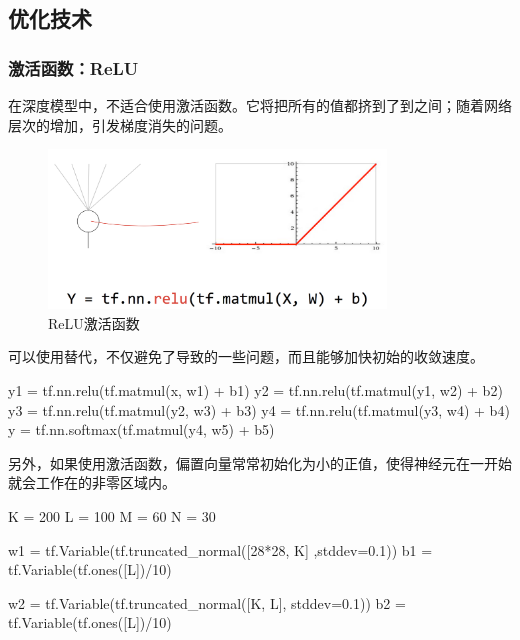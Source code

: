 \begin{content}
\begin{content}
\subsection{优化技术}

\subsubsection{激活函数：ReLU}

在深度模型中，不适合使用激活函数。它将把所有的值都挤到了到之间；随着网络层次的增加，引发梯度消失的问题。

\begin{figure}[H]
\centering
\includegraphics[width=0.8\textwidth]{figures/mnist-relu.png}
\caption{ReLU激活函数}
 \label{fig:mnist-relu}
\end{figure}

可以使用替代，不仅避免了导致的一些问题，而且能够加快初始的收敛速度。

\begin{leftbar}
\begin{python}
y1 = tf.nn.relu(tf.matmul(x,  w1) + b1)
y2 = tf.nn.relu(tf.matmul(y1, w2) + b2)
y3 = tf.nn.relu(tf.matmul(y2, w3) + b3)
y4 = tf.nn.relu(tf.matmul(y3, w4) + b4)
y  = tf.nn.softmax(tf.matmul(y4, w5) + b5)
\end{python}
\end{leftbar}

另外，如果使用激活函数，偏置向量常常初始化为小的正值，使得神经元在一开始就会工作在的非零区域内。

\begin{leftbar}
\begin{python}
K = 200
L = 100
M = 60
N = 30

w1 = tf.Variable(tf.truncated_normal([28*28, K] ,stddev=0.1)) 
b1 = tf.Variable(tf.ones([L])/10)

w2 = tf.Variable(tf.truncated_normal([K, L], stddev=0.1))
b2 = tf.Variable(tf.ones([L])/10)


\end{python}
\end{leftbar}
\end{content}
\end{content}
